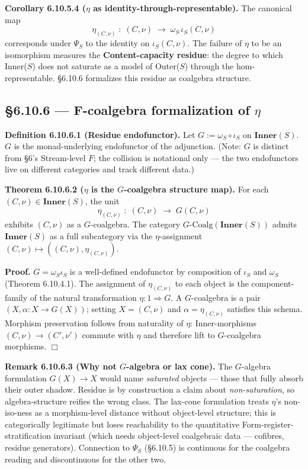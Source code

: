 \documentclass[11pt, openany]{book}
\begin{document}
\textbf{Corollary 6.10.5.4 ($\eta$ as identity-through-representable).} The canonical map
\[
\eta_{(C, \nu)} \;:\; (C, \nu) \;\longrightarrow\; \omega_S \, \iota_S (C, \nu)
\]
corresponds under $\Psi_S$ to the identity on $\iota_S(C, \nu)$. The failure of $\eta$ to be an isomorphism measures the \textbf{Content-capacity residue}: the degree to which Inner($S$) does not saturate as a model of Outer($S$) through the hom-representable. §6.10.6 formalizes this residue as coalgebra structure.

\subsection{§6.10.6 --- F-coalgebra formalization of $\eta$}

\textbf{Definition 6.10.6.1 (Residue endofunctor).} Let $G := \omega_S \circ \iota_S$ on $\mathbf{Inner}(S)$. $G$ is the monad-underlying endofunctor of the adjunction. (Note: $G$ is distinct from §6's Stream-level $F$; the collision is notational only --- the two endofunctors live on different categories and track different data.)

\textbf{Theorem 6.10.6.2 ($\eta$ is the $G$-coalgebra structure map).} For each $(C, \nu) \in \mathbf{Inner}(S)$, the unit
\[
\eta_{(C, \nu)} \;:\; (C, \nu) \;\longrightarrow\; G(C, \nu)
\]
exhibits $(C, \nu)$ as a $G$-coalgebra. The category $G\text{-Coalg}(\mathbf{Inner}(S))$ admits $\mathbf{Inner}(S)$ as a full subcategory via the $\eta$-assignment $(C, \nu) \mapsto ((C, \nu), \eta_{(C, \nu)})$.

\textbf{Proof.} $G = \omega_S \iota_S$ is a well-defined endofunctor by composition of $\iota_S$ and $\omega_S$ (Theorem 6.10.4.1). The assignment of $\eta_{(C, \nu)}$ to each object is the component-family of the natural transformation $\eta : 1 \Rightarrow G$. A $G$-coalgebra is a pair $(X, \alpha : X \to G(X))$; setting $X = (C, \nu)$ and $\alpha = \eta_{(C, \nu)}$ satisfies this schema. Morphism preservation follows from naturality of $\eta$: Inner-morphisms $(C, \nu) \to (C', \nu')$ commute with $\eta$ and therefore lift to $G$-coalgebra morphisms. $\Box$

\textbf{Remark 6.10.6.3 (Why not $G$-algebra or lax cone).} The $G$-algebra formulation $G(X) \to X$ would name \textit{saturated} objects --- those that fully absorb their outer shadow. Residue is by construction a claim about \textit{non-saturation}, so algebra-structure reifies the wrong class. The lax-cone formulation treats $\eta$'s non-iso-ness as a morphism-level distance without object-level structure; this is categorically legitimate but loses reachability to the quantitative Form-register-stratification invariant (which needs object-level coalgebraic data --- cofibres, residue generators). Connection to $\Psi_S$ (§6.10.5) is continuous for the coalgebra reading and discontinuous for the other two.
\end{document}
